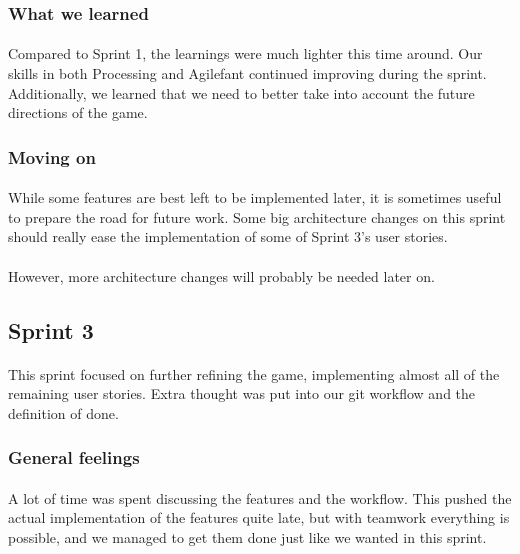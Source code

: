 \subsubsection{What we learned}

\paragraph{} Compared to Sprint 1, the learnings were much lighter this time around. Our skills in both Processing and Agilefant continued improving during the sprint. Additionally, we learned that we need to better take into account the future directions of the game.

\subsubsection{Moving on}

\paragraph{} While some features are best left to be implemented later, it is sometimes useful to prepare the road for future work. Some big architecture changes on this sprint should really ease the implementation of some of Sprint 3's user stories.

\paragraph{} However, more architecture changes will probably be needed later on.


\subsection{Sprint 3}

\paragraph{} This sprint focused on further refining the game, implementing almost all of the remaining user stories. Extra thought was put into our git workflow and the definition of done.

\subsubsection{General feelings}

\paragraph{} A lot of time was spent discussing the features and the workflow. This pushed the actual implementation of the features quite late, but with teamwork everything is possible, and we managed to get them done just like we wanted in this sprint.

